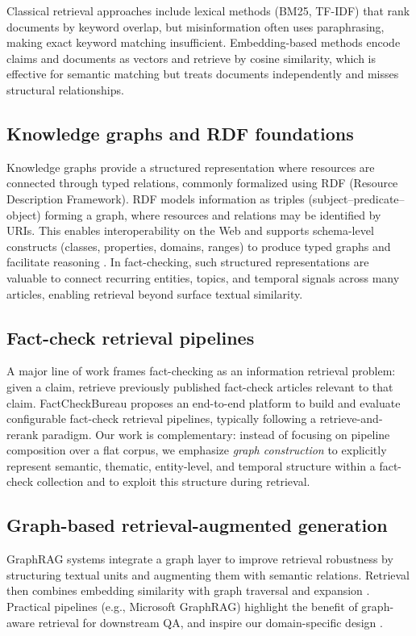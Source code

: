 \documentclass[10pt]{article}
\begin{document}
Classical retrieval approaches include lexical methods (BM25, TF-IDF) that rank documents by keyword overlap, but misinformation often uses paraphrasing, making exact keyword matching insufficient. Embedding-based methods encode claims and documents as vectors and retrieve by cosine similarity, which is effective for semantic matching but treats documents independently and misses structural relationships.

\subsection{Knowledge graphs and RDF foundations}
Knowledge graphs provide a structured representation where resources are connected through typed relations, commonly formalized using RDF (Resource Description Framework). RDF models information as triples (subject--predicate--object) forming a graph, where resources and relations may be identified by URIs. This enables interoperability on the Web and supports schema-level constructs (classes, properties, domains, ranges) to produce typed graphs and facilitate reasoning \cite{manolescuRDFintro}. In fact-checking, such structured representations are valuable to connect recurring entities, topics, and temporal signals across many articles, enabling retrieval beyond surface textual similarity.

\subsection{Fact-check retrieval pipelines}
A major line of work frames fact-checking as an information retrieval problem: given a claim, retrieve previously published fact-check articles relevant to that claim. FactCheckBureau \cite{balalau2024factcheckbureau} proposes an end-to-end platform to build and evaluate configurable fact-check retrieval pipelines, typically following a retrieve-and-rerank paradigm. Our work is complementary: instead of focusing on pipeline composition over a flat corpus, we emphasize \emph{graph construction} to explicitly represent semantic, thematic, entity-level, and temporal structure within a fact-check collection and to exploit this structure during retrieval.

\subsection{Graph-based retrieval-augmented generation}
GraphRAG systems integrate a graph layer to improve retrieval robustness by structuring textual units and augmenting them with semantic relations. Retrieval then combines embedding similarity with graph traversal and expansion \cite{zhang2025graphrag}. Practical pipelines (e.g., Microsoft GraphRAG) highlight the benefit of graph-aware retrieval for downstream QA, and inspire our domain-specific design \cite{msftgraphrag}.
\end{document}
